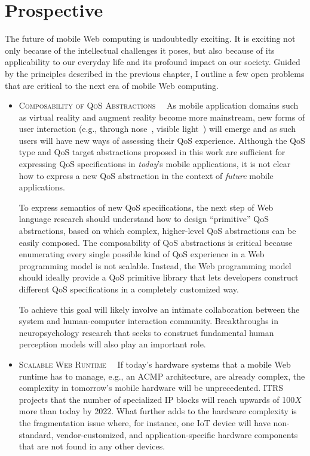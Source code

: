 \section{Prospective}
\label{sec:conc:pros}

The future of mobile Web computing is undoubtedly exciting. It is exciting not only because of the intellectual challenges it poses, but also because of its applicability to our everyday life and its profound impact on our society. Guided by the principles described in the previous chapter, I outline a few open problems that are critical to the next era of mobile Web computing.

\begin{itemize}
  \item \textsc{Composability of QoS Abstractions~~} As mobile application domains such as virtual reality and augment reality become more mainstream, new forms of user interaction (e.g., through nose~\cite{nosewatch}, visible light~\cite{license}) will emerge and as such users will have new ways of assessing their QoS experience. Although the QoS type and QoS target abstractions proposed in this work are sufficient for expressing QoS specifications in \textit{today}'s mobile applications, it is not clear how to express a new QoS abstraction in the context of \textit{future} mobile applications.
  
  To express semantics of new QoS specifications, the next step of Web language research should understand how to design ``primitive'' QoS abstractions, based on which complex, higher-level QoS abstractions can be easily composed. The composability of QoS abstractions is critical because enumerating every single possible kind of QoS experience in a Web programming model is not scalable. Instead, the Web programming model should ideally provide a QoS primitive library that lets developers construct different QoS specifications in a completely customized way.
  
  To achieve this goal will likely involve an intimate collaboration between the system and human-computer interaction community. Breakthroughs in neuropsychology research that seeks to construct fundamental human perception models will also play an important role.
     
  \item \textsc{Scalable Web Runtime~~} If today's hardware systems that a mobile Web runtime has to manage, e.g., an ACMP architecture, are already complex, the complexity in tomorrow's mobile hardware will be unprecedented. ITRS projects that the number of specialized IP blocks will reach upwards of 100$X$ more than today by 2022. What further adds to the hardware complexity is the fragmentation issue where, for instance, one IoT device will have non-standard, vendor-customized, and application-specific hardware components that are not found in any other devices.
  

\end{itemize}

